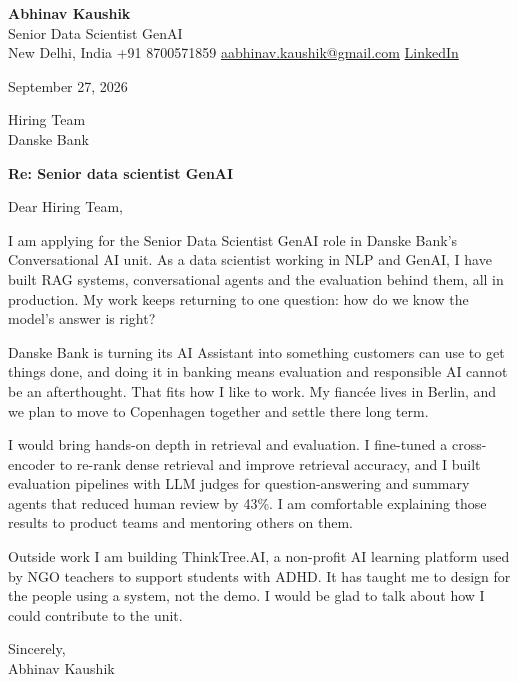 \documentclass[11pt,a4paper]{article}
\begin{document}
{\Large\bfseries Abhinav Kaushik}\\
Senior Data Scientist GenAI\\
New Delhi, India \textbar{} +91 8700571859 \textbar{} \href{mailto:aabhinav.kaushik@gmail.com}{aabhinav.kaushik@gmail.com} \textbar{} \href{https://www.linkedin.com/in/abhinav-kaushik10/}{LinkedIn}  

September 27, 2026

Hiring Team\\
Danske Bank

\textbf{Re: Senior data scientist GenAI}

Dear Hiring Team,

I am applying for the Senior Data Scientist GenAI role in Danske Bank's Conversational AI unit. As a data scientist working in NLP and GenAI, I have built RAG systems, conversational agents and the evaluation behind them, all in production. My work keeps returning to one question: how do we know the model's answer is right?

Danske Bank is turning its AI Assistant into something customers can use to get things done, and doing it in banking means evaluation and responsible AI cannot be an afterthought. That fits how I like to work. My fiancée lives in Berlin, and we plan to move to Copenhagen together and settle there long term.

I would bring hands-on depth in retrieval and evaluation. I fine-tuned a cross-encoder to re-rank dense retrieval and improve retrieval accuracy, and I built evaluation pipelines with LLM judges for question-answering and summary agents that reduced human review by 43\%. I am comfortable explaining those results to product teams and mentoring others on them.

Outside work I am building ThinkTree.AI, a non-profit AI learning platform used by NGO teachers to support students with ADHD. It has taught me to design for the people using a system, not the demo. I would be glad to talk about how I could contribute to the unit.

Sincerely,\\[4pt]
Abhinav Kaushik
\end{document}
